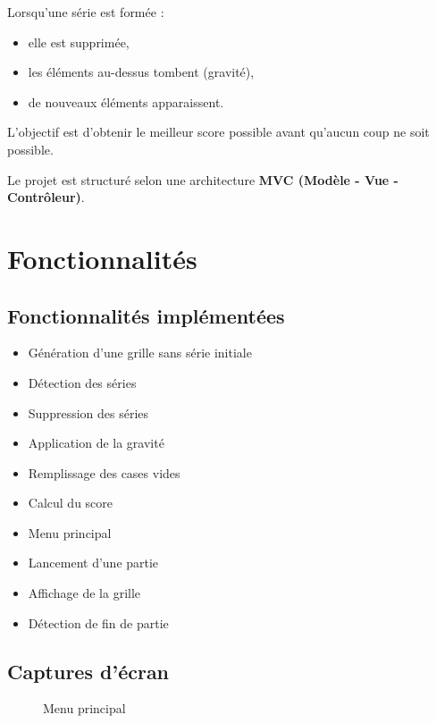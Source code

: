 \documentclass[a4paper,12pt]{article}
\begin{document}
Lorsqu’une série est formée :
\begin{itemize}
    \item elle est supprimée,
    \item les éléments au-dessus tombent (gravité),
    \item de nouveaux éléments apparaissent.
\end{itemize}

L’objectif est d’obtenir le meilleur score possible avant qu’aucun coup ne soit possible.

Le projet est structuré selon une architecture \textbf{MVC (Modèle - Vue - Contrôleur)}.

\section{Fonctionnalités}

\subsection{Fonctionnalités implémentées}

\begin{itemize}
    \item Génération d’une grille sans série initiale
    \item Détection des séries
    \item Suppression des séries
    \item Application de la gravité
    \item Remplissage des cases vides
    \item Calcul du score
    \item Menu principal
    \item Lancement d’une partie
    \item Affichage de la grille
    \item Détection de fin de partie
\end{itemize}

\subsection{Captures d’écran}

\begin{figure}[h]
    \centering
    \caption{Menu principal}
\end{figure}

\end{document}
